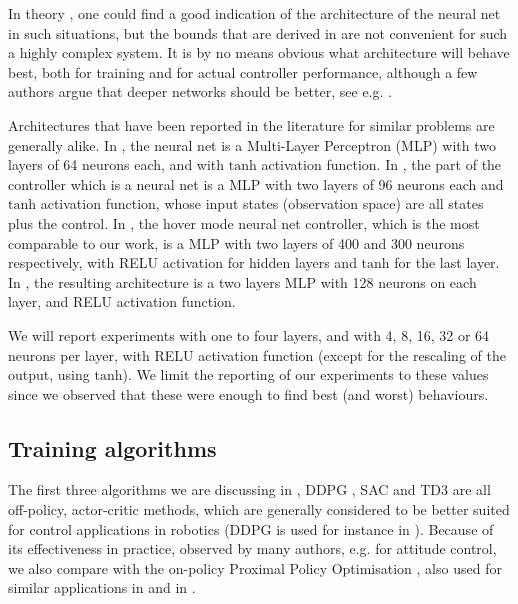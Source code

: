 \documentclass[anonymous=true,format=sigconf, screen=true, review=false]{acmart}
\begin{document}
In theory \cite{Ferlez}, one could find a good indication of the architecture of the neural net in such situations, but the bounds  that are derived in \cite{Ferlez} are not convenient for such a highly complex system. It is by no means obvious what architecture will behave best, both for training and for actual controller performance, although a few authors argue that deeper networks should be better, see e.g. 
\cite{LUCIA2018511}. 

Architectures that have been reported in the literature for similar problems are generally alike. 
In \cite{simtoreal}, 
the neural net is a Multi-Layer Perceptron (MLP) with two layers of 64 neurons each, and with $\mathrm{tanh}$ activation function. %
In \cite{fei2020learn}, the part of  the controller which is a neural net is a MLP with two layers of 96 neurons each and $\mathrm{tanh}$ activation function, %
whose input states (observation space) are all states plus the control. 
In \cite{Koning}, the hover mode neural net controller, which is the most comparable to our work, is a MLP with two layers of 400 and 300 neurons respectively, with RELU activation for hidden layers and $\mathrm{tanh}$ for the last layer. 
In \cite{stockholm}, the resulting architecture is a two layers MLP with 128 neurons on each layer, and RELU activation function. 



We will report experiments with one to four layers, and with 4, 8, 16, 32 or 64 neurons per layer, with RELU activation function (except for the rescaling of the output, using $\mathrm{tanh}$). We limit the reporting of our experiments to these values since we observed that these were enough to find best (and worst) behaviours. 

\subsection{Training algorithms}

\label{subsec:training}

The first three algorithms we are discussing in , DDPG \cite{DDPG}, SAC \cite{SAC} and TD3 \cite{TD3} are all off-policy, actor-critic methods, which are generally considered to be better suited for control applications in robotics \cite{Sutton} (DDPG is used for instance in \cite{fei2020learn}). Because of its effectiveness in practice, observed by many authors, e.g. \cite{rl} for attitude control, we also compare with the on-policy 
Proximal Policy Optimisation \cite{PPO}, also used  for similar applications in 
\cite{simtoreal} and  
in \cite{stockholm}. 
\end{document}
